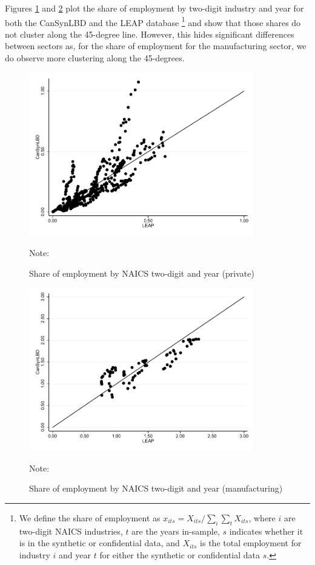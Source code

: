Figures \ref{EmploymentSharePrivate} and \ref{EmploymentShareManufacturing} plot the share of employment by two-digit industry and year for both the CanSynLBD and the LEAP database
\footnote{We define the share of employment as $x_{its} = X_{its}/\sum_{i} \sum_{t} X_{its}$, where $i$ are two-digit NAICS industries, $t$ are the years in-sample, $s$ indicates whether it is in the synthetic or confidential data, and $X_{its}$ is the total employment for industry $i$ and year $t$ for either the synthetic or confidential data $s$.} and show that those shares do not cluster along the 45-degree line. However, this hides significant differences between sectors as, for the share of employment for the manufacturing sector, we do observe more clustering along the 45-degrees.
\begin{figure} [H]
\centering
\caption{Share of employment by NAICS two-digit and year (private)} \label{EmploymentSharePrivate}
\includegraphics[height=2.8in, width=.7\linewidth]{graphs/Share_of_employment_by_NAICS_two-digit_and_year_private_bw.pdf} 
\begin{minipage}{0.85\textwidth}
{\footnotesize Note: \TableNote \par}
\end{minipage}
\end{figure}
\vspace{-15.5pt}
\begin{figure} [H]
\centering
\caption{Share of employment by NAICS two-digit and year (manufacturing)} \label{EmploymentShareManufacturing}
\includegraphics[height=2.8in, width=.7\linewidth]{graphs/Share_of_employment_by_NAICS_two-digit_and_year_Manufacturing_bw.pdf} 
\begin{minipage}{0.85\textwidth}
{\footnotesize Note: \TableNote \par}
\end{minipage}
\end{figure}

